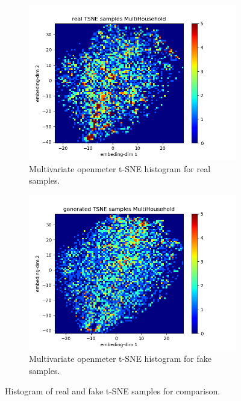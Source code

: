 \begin{figure}
    \centering
    \begin{subfigure}[b]{0.45\textwidth}
        \centering
        \includegraphics[width=\textwidth]{images/om_multi_real_histo.png}
        \caption{Multivariate openmeter t-SNE histogram for real samples.}
        \label{fig:om tsne multi real histo}
    \end{subfigure}
    \begin{subfigure}[b]{0.45\textwidth}
        \centering
        \includegraphics[width=\textwidth]{images/om_multi_fake_histo.png}
        \caption{Multivariate openmeter t-SNE histogram for fake samples.}
        \label{fig:om tsne multi fake histo}
    \end{subfigure}
       \caption{Histogram of real and fake t-SNE samples for comparison.}
       \label{fig:om tsne multi histo}
\end{figure}